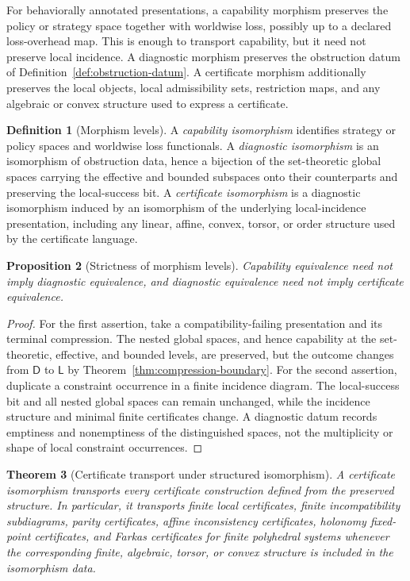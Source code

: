 \documentclass[11pt]{article}
\theoremstyle{plain}
\newtheorem{theorem}{Theorem}[section]
\newtheorem{proposition}[theorem]{Proposition}
\theoremstyle{definition}
\newtheorem{definition}[theorem]{Definition}
\theoremstyle{remark}
\begin{document}
For behaviorally annotated presentations, a capability morphism preserves the
policy or strategy space together with worldwise loss, possibly up to a declared
loss-overhead map. This is enough to transport capability, but it need not
preserve local incidence. A diagnostic morphism preserves the obstruction datum
of Definition~\ref{def:obstruction-datum}. A certificate morphism additionally
preserves the local objects, local admissibility sets, restriction maps, and any
algebraic or convex structure used to express a certificate.

\begin{definition}[Morphism levels]
\label{def:morphism-levels}
A \emph{capability isomorphism} identifies strategy or policy spaces and
worldwise loss functionals. A \emph{diagnostic isomorphism} is an isomorphism of
obstruction data, hence a bijection of the set-theoretic global spaces carrying
the effective and bounded subspaces onto their counterparts and preserving the
local-success bit. A \emph{certificate isomorphism} is a diagnostic isomorphism
induced by an isomorphism of the underlying local-incidence presentation,
including any linear, affine, convex, torsor, or order structure used by the
certificate language.
\end{definition}

\begin{proposition}[Strictness of morphism levels]
\label{prop:morphism-level-strictness}
Capability equivalence need not imply diagnostic equivalence, and diagnostic
equivalence need not imply certificate equivalence.
\end{proposition}

\begin{proof}
For the first assertion, take a compatibility-failing presentation and its
terminal compression. The nested global spaces, and hence capability at the
set-theoretic, effective, and bounded levels, are preserved, but the outcome
changes from $\mathsf D$ to $\mathsf L$ by
Theorem~\ref{thm:compression-boundary}. For the second assertion, duplicate a
constraint occurrence in a finite incidence diagram. The local-success bit and
all nested global spaces can remain unchanged, while the incidence structure and
minimal finite certificates change. A diagnostic datum records emptiness and
nonemptiness of the distinguished spaces, not the multiplicity or shape of local
constraint occurrences.
\end{proof}

\begin{theorem}[Certificate transport under structured isomorphism]
\label{thm:certificate-transport-monograph}
A certificate isomorphism transports every certificate construction defined from
the preserved structure. In particular, it transports finite local certificates,
finite incompatibility subdiagrams, parity certificates, affine inconsistency
certificates, holonomy fixed-point certificates, and Farkas certificates for
finite polyhedral systems whenever the corresponding finite, algebraic, torsor,
or convex structure is included in the isomorphism data.
\end{theorem}
\end{document}
